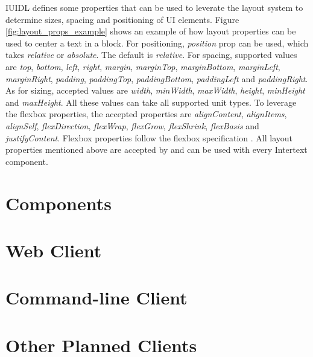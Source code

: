 IUIDL defines some properties that can be used to leverate the layout system to determine sizes, spacing and positioning of UI elements. Figure \ref{fig:layout_props_example} shows an example of how layout properties can be used to center a text in a block. For positioning, \textit{position} prop can be used, which takes \textit{relative} or \textit{absolute}. The default is \textit{relative}. For spacing, supported values are \textit{top}, \textit{bottom}, \textit{left}, \textit{right}, \textit{margin}, \textit{marginTop}, \textit{marginBottom}, \textit{marginLeft}, \textit{marginRight}, \textit{padding}, \textit{paddingTop}, \textit{paddingBottom}, \textit{paddingLeft} and \textit{paddingRight}. As for sizing, accepted values are \textit{width}, \textit{minWidth}, \textit{maxWidth}, \textit{height}, \textit{minHeight} and \textit{maxHeight}. All these values can take all supported unit types. To leverage the flexbox properties, the accepted properties are \textit{alignContent}, \textit{alignItems}, \textit{alignSelf}, \textit{flexDirection}, \textit{flexWrap}, \textit{flexGrow}, \textit{flexShrink}, \textit{flexBasis} and \textit{justifyContent}. Flexbox properties follow the flexbox specification \cite{FlexSpec1} \cite{FlexSpec2}. All layout properties mentioned above are accepted by and can be used with every Intertext component.

\section{Components}



\section{Web Client}

\section{Command-line Client}

\section{Other Planned Clients}